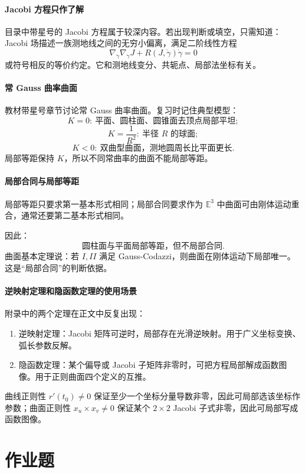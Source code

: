 \documentclass[UTF8,12pt,a4paper]{ctexart}
\newcommand{\E}{\mathbb E}
\begin{document}
\paragraph{Jacobi 方程只作了解}
目录中带星号的 Jacobi 方程属于较深内容。若出现判断或填空，只需知道：Jacobi 场描述一族测地线之间的无穷小偏离，满足二阶线性方程
\[
\nabla_{\dot\gamma}\nabla_{\dot\gamma}J
+R(J,\dot\gamma)\dot\gamma=0
\]
或符号相反的等价约定。它和测地线变分、共轭点、局部法坐标有关。

\paragraph{常 Gauss 曲率曲面}
教材带星号章节讨论常 Gauss 曲率曲面。复习时记住典型模型：
\[
K=0:\ \text{平面、圆柱面、圆锥面去顶点局部平坦};
\]
\[
K=\frac1{R^2}:\ \text{半径 }R\text{ 的球面};
\]
\[
K<0:\ \text{双曲型曲面，测地圆周长比平面更长}.
\]
局部等距保持 $K$，所以不同常曲率的曲面不能局部等距。

\paragraph{局部合同与局部等距}
局部等距只要求第一基本形式相同；局部合同要求作为 $\E^3$ 中曲面可由刚体运动重合，通常还要第二基本形式相同。

因此：
\[
\text{圆柱面与平面局部等距，但不局部合同}.
\]
曲面基本定理说：若 $I,II$ 满足 Gauss-Codazzi，则曲面在刚体运动下局部唯一。这是“局部合同”的判断依据。

\paragraph{逆映射定理和隐函数定理的使用场景}
附录中的两个定理在正文中反复出现：
\begin{enumerate}
\item 逆映射定理：Jacobi 矩阵可逆时，局部存在光滑逆映射。用于广义坐标变换、弧长参数反解。
\item 隐函数定理：某个偏导或 Jacobi 子矩阵非零时，可把方程局部解成函数图像。用于正则曲面四个定义的互推。
\end{enumerate}

曲线正则性 $r'(t_0)\ne0$ 保证至少一个坐标分量导数非零，因此可局部选该坐标作参数；曲面正则性 $x_u\times x_v\ne0$ 保证某个 $2\times2$ Jacobi 子式非零，因此可局部写成函数图像。

\section{作业题}
\end{document}
